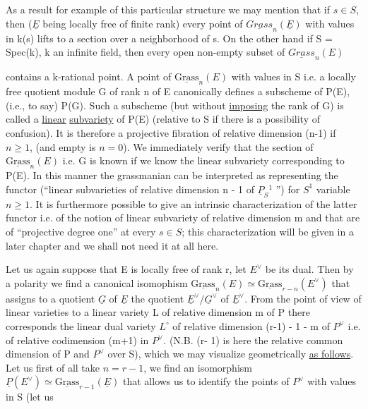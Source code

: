 \documentclass[11pt]{article}
\newcommand{\scanpage}[1]{\par\bigskip\noindent{\small\sffamily[scan #1]}\par}
\newcommand{\mspage}[1]{{\small\sffamily[p.\,#1]}}
\newcommand{\uline}[1]{\underline{#1}}
\begin{document}
As a result for example of this particular structure we may
mention that if $s \in S$, then ($\underline{E}$ being locally free of finite rank)
every point of $\underline{Grass}_n(\underline{E})$ with values in k(s) lifts to a section
over a neighborhood of s.  On the other hand if S = Spec(k), k an
infinite field, then every open non-empty subset of $\underline{Grass}_n(E)$

\clearpage
\scanpage{24/73}
\mspage{73}

contains a k-rational point.  A point of $\underline{\mathrm{Grass}}_{n}(E)$ with values in S
i.e. a locally free quotient module G of rank n of E canonically
defines a subscheme of P(E), (i.e., to say) P(G).  Such a
subscheme (but without \uline{imposing} the rank of G) is called a \uline{linear}
\uline{subvariety} of P(E) (relative to S if there is a possibility of
confusion).  It is therefore a projective fibration of relative
dimension (n-1) if $n \geq 1$, (and empty is $n = 0$).  We immediately
verify that the section of $\underline{\mathrm{Grass}}_{n}(E)$ i.e. G is known if we know the
linear subvariety corresponding to P(E).  In this manner the
grassmanian can be interpreted as representing the functor
(``linear subvarieties of relative dimension n - 1 of $\underline{P}_{S}{}^{1}$ '') for $S^{1}$
variable $n \geq 1$.  It is furthermore possible to give an intrinsic
characterization of the latter functor i.e. of the notion of
linear subvariety of relative dimension m and that are of
``projective degree one'' at every $s \in S$; this characterization will
be given in a later chapter and we shall not need it at all here.

Let us again suppose that E is locally free of rank r, let $E^{\vee}$
be its dual.  Then by a polarity we find a canonical isomophism
$\underline{\mathrm{Grass}}_{n}(E) \simeq \underline{\mathrm{Grass}}_{r-n}(E^{\vee})$ that assigns to a quotient $\underline{G}$ of $\underline{E}$ the
quotient $\underline{E}^{\vee}/\underline{G}^{\vee}$ of $\underline{E}^{\vee}$.  From the point of view of linear varieties
to a linear variety L of relative dimension m of P there
corresponds the linear dual variety $L^{\circ}$ of relative dimension (r-1)
- 1 - m of $P^{\vee}$ i.e. of relative codimension (m+1) in $P^{\vee}$.  (N.B. (r-%
1) is here the relative common dimension of P and $P^{\vee}$ over S), which
we may visualize geometrically \uline{as follows}.  Let us first of all
take $n = r - 1$, we find an isomorphism $\underline{P}(E^{\vee}) \simeq \underline{\mathrm{Grass}}_{r-1}(\underline{E})$ that
allows us to identify the points of $P^{\vee}$ with values in S (let us
\end{document}
